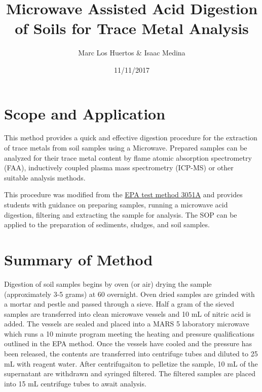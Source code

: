 \documentclass[12pt]{../SOP3_beta}\usepackage[]{graphicx}\usepackage[]{color}
\title{Microwave Assisted Acid Digestion of Soils for Trace Metal Analysis}
\date{11/11/2017}
\author{Marc Los Huertos \& Isaac Medina}
\begin{document}
\maketitle

\section{Scope and Application}

\NP This method provides a quick and effective digestion procedure for the extraction of trace metals from soil samples using a Microwave. Prepared samples can be analyzed for their trace metal content by flame atomic absorption spectrometry (FAA), inductively coupled plasma mass spectrometry (ICP-MS) or other suitable analysis methods. 

\NP This procedure was modified from the \href{https://www.google.com/url?sa=t&rct=j&q=&esrc=s&source=web&cd=1&cad=rja&uact=8&ved=0ahUKEwjNmefY3tfWAhVP92MKHatgCaQQFggqMAA&url=https%3A%2F%2Fwww.epa.gov%2Fsites%2Fproduction%2Ffiles%2F2015-12%2Fdocuments%2F3051a.pdf&usg=AOvVaw1LPlngQyM_L4Zu4SC-sATE}{EPA test method 3051A} and provides students with guidance on preparing samples, running a microwave acid digestion, filtering and extracting the sample for analysis. 
\NP The SOP can be applied to the preparation of sediments, sludges, and soil samples.

\section{Summary of Method}
Digestion of soil samples begins by oven (or air) drying the sample (approximately 3-5 grams) at 60 \textcelsius{} overnight. Oven dried samples are grinded with a mortar and pestle and passed through a sieve. Half a gram of the sieved samples are transferred into clean microwave vessels and 10 mL of nitric acid is added. The vessels are sealed and placed into a MARS 5 laboratory microwave which runs a 10 minute program meeting the heating and pressure qualifications outlined in the EPA method. Once the vessels have cooled and the pressure has been released, the contents are transferred into centrifuge tubes and diluted to 25 mL with reagent water. After centrifugaiton to pelletize the sample, 10 mL of the supernatant are withdrawn and syringed filtered. The filtered samples are placed into 15 mL centrifuge tubes to await analysis. 

\tableofcontents

\newpage
\end{document}
